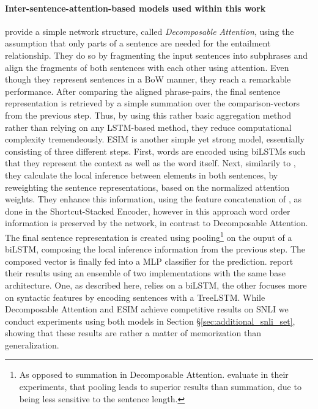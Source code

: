 \paragraph*{Inter-sentence-attention-based models used within this work}
\cite{parikh2016decomposable} provide a simple network structure, called \textit{Decomposable Attention}, using the assumption that only parts of a sentence are needed for the entailment relationship. They do so by fragmenting the input sentences into subphrases and align the fragments of both sentences with each other using attention. Even though they represent sentences in a \ac{BoW} manner, they reach a remarkable performance. After comparing the aligned phrase-pairs, the final sentence representation is retrieved by a simple summation over the comparison-vectors from the previous step. Thus, by using this rather basic aggregation method rather than relying on any \ac{LSTM}-based method, they reduce computational complexity tremendeously. \ac{ESIM} \citep{chen2017enhanced} is another simple yet strong model, essentially consisting of three different steps. First, words are encoded using \ac{biLSTM}s such that they represent the context as well as the word itself. Next, similarily to \cite{parikh2016decomposable}, they calculate the local inference between elements in both sentences, by reweighting the sentence representations, based on the normalized attention weights. They enhance this information, using the feature concatenation of \cite{mou2015natural}, as done in the Shortcut-Stacked Encoder, however in this approach word order information is preserved by the network, in contrast to Decomposable Attention. The final sentence representation is created using pooling\footnote{As opposed to summation in Decomposable Attention. \cite{chen2017enhanced} evaluate in their experiments, that pooling leads to superior results than summation, due to being less sensitive to the sentence length.} on the ouput of a \ac{biLSTM}, composing the local inference information from the previous step. The composed vector is finally fed into a \ac{MLP} classifier for the prediction. \cite{chen2017enhanced} report their results using an ensemble of two implementations with the same base architecture. One, as described here, relies on a \ac{biLSTM}, the other focuses more on syntactic features by encoding sentences with a TreeLSTM. While Decomposable Attention and ESIM achieve competitive results on \ac{SNLI} we conduct experiments using both models in Section §\ref{sec:additional_snli_set}, showing that these results are rather a matter of memorization than generalization.

